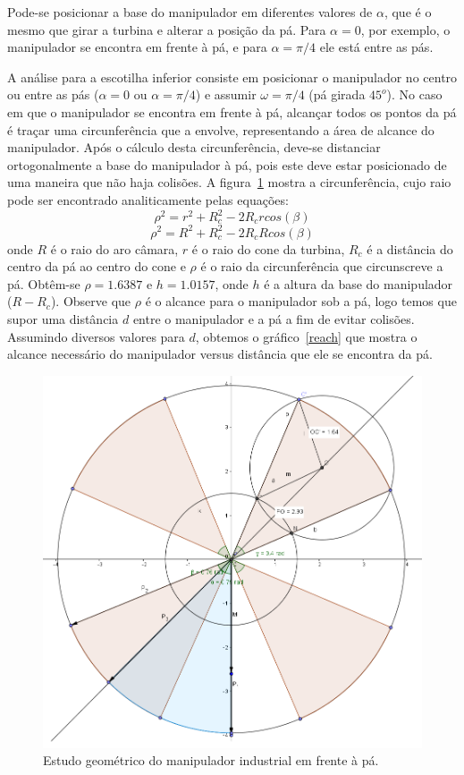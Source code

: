 Pode-se posicionar a base do manipulador em diferentes valores de $\alpha$, que é
o mesmo que girar a turbina e alterar a posição da pá. Para $\alpha = 0$, por
exemplo, o manipulador se encontra em frente à pá, e para $\alpha = \pi/4$ ele está entre as pás.

A análise para a escotilha inferior consiste em posicionar o manipulador no
centro ou entre as pás ($\alpha = 0$ ou $\alpha = \pi/4$) e assumir $\omega =
\pi/4$ (pá girada $45^o$). No caso em que o
manipulador se encontra em frente à pá, alcançar todos os pontos da pá  é
traçar uma circunferência que a envolve, representando
a área de alcance do manipulador. Após o cálculo desta
circunferência, deve-se distanciar ortogonalmente a base do manipulador à pá,
pois este deve estar posicionado de uma maneira que não haja colisões. A
figura~\ref{paemfrente} mostra a circunferência, cujo raio pode ser encontrado
analiticamente pelas equações:
$$\rho ^2 = r^2+R_c^2-2R_crcos(\beta)$$
$$\rho ^2 = R^2+R_c^2-2R_cRcos(\beta)$$
onde $R$ é o raio do aro câmara, $r$ é o raio do cone da turbina, $R_c$ é a
distância do centro da pá ao centro do cone e $\rho$ é o raio da circunferência
que circunscreve a pá. Obtêm-se  $\rho=1.6387$ e $h=1.0157$, onde $h$ é a altura
da base do manipulador ($R-R_c$). Observe que $\rho$ é o alcance para o
manipulador sob a pá, logo temos que supor uma distância $d$ entre o manipulador
e a pá a fim de evitar colisões. Assumindo diversos valores para $d$, obtemos o
gráfico~\ref{reach} que mostra o alcance necessário do manipulador versus
distância que ele se encontra da pá. 

\begin{figure}[h!]
\centering
	\includegraphics[width=\columnwidth]{figs/estudo/geometrico/paemfrente.png} 
	\caption{Estudo geométrico do manipulador industrial em frente à pá.}
	\label{paemfrente}
\end{figure}

